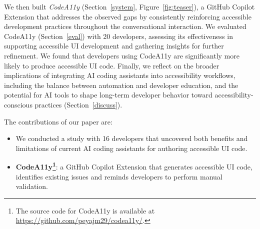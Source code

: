 We then built \textit{CodeA11y} (Section~\ref{system}, Figure~\ref{fig:teaser}), a GitHub Copilot Extension that addresses the observed gaps by consistently reinforcing accessible development practices throughout the conversational interaction. We evaluated CodeA11y (Section~\ref{eval}) with 20 developers, assessing its effectiveness in supporting accessible UI development and gathering insights for further refinement. We found that developers using CodeA11y are significantly more likely to produce accessible UI code. Finally, we reflect on the broader implications of integrating AI coding assistants into accessibility workflows, including the balance between automation and developer education, and the potential for AI tools to shape long-term developer behavior toward accessibility-conscious practices (Section~\ref{discuss}).

The contributions of our paper are:
\begin{itemize}[noitemsep, topsep=0pt]
    \item We conducted a study with 16 developers that uncovered both benefits and limitations of current AI coding assistants for authoring accessible UI code.  
    \item \textbf{CodeA11y\footnote{The source code for CodeA11y is available at \url{https://github.com/peyajm29/codea11y/}.}}: a GitHub Copilot Extension that generates accessible UI code, identifies existing issues and reminds developers to perform manual validation.
\end{itemize}


